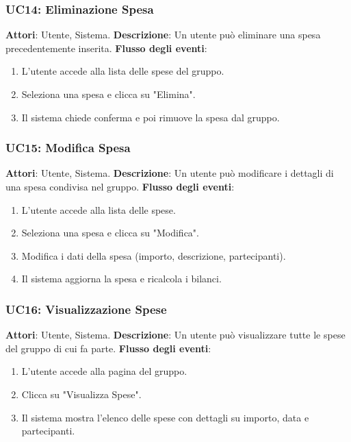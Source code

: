 \subsubsection{UC14: Eliminazione Spesa}
\textbf{Attori}: Utente, Sistema.
\newline
\newline
\textbf{Descrizione}: Un utente può eliminare una spesa precedentemente inserita.
\newline
\newline
\textbf{Flusso degli eventi}:
\begin{enumerate}
    \item L’utente accede alla lista delle spese del gruppo.
    \item Seleziona una spesa e clicca su "Elimina".
    \item Il sistema chiede conferma e poi rimuove la spesa dal gruppo.
\end{enumerate}

\subsubsection{UC15: Modifica Spesa}
\textbf{Attori}: Utente, Sistema.
\newline
\newline
\textbf{Descrizione}: Un utente può modificare i dettagli di una spesa condivisa nel gruppo.
\newline
\newline
\textbf{Flusso degli eventi}:
\begin{enumerate}
    \item L’utente accede alla lista delle spese.
    \item Seleziona una spesa e clicca su "Modifica".
    \item Modifica i dati della spesa (importo, descrizione, partecipanti).
    \item Il sistema aggiorna la spesa e ricalcola i bilanci.
\end{enumerate}

\subsubsection{UC16: Visualizzazione Spese}
\textbf{Attori}: Utente, Sistema.
\newline
\newline
\textbf{Descrizione}: Un utente può visualizzare tutte le spese del gruppo di cui fa parte.
\newline
\newline
\textbf{Flusso degli eventi}:
\begin{enumerate}
    \item L’utente accede alla pagina del gruppo.
    \item Clicca su "Visualizza Spese".
    \item Il sistema mostra l’elenco delle spese con dettagli su importo, data e partecipanti.
\end{enumerate}

